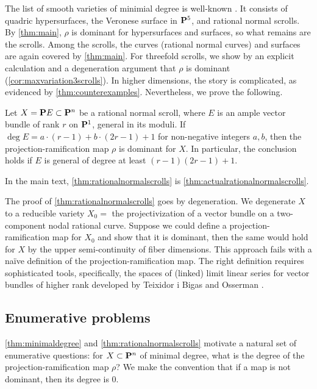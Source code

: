 \documentclass[11pt,reqno]{amsart}
\theoremstyle{plain}
\theoremstyle{definition}
\theoremstyle{remark}
\numberwithin{equation}{section}
\numberwithin{equation}{section}
\begin{document}
The list of smooth varieties of minimial degree is well-known \cite[Theorem~19.9]{har:95}.
It consists of quadric hypersurfaces, the Veronese surface in $\P^5$, and rational normal scrolls.
By \autoref{thm:main}, $\rho$ is dominant for hypersurfaces and surfaces, so what remains are the scrolls.
Among the scrolls, the curves (rational normal curves) and surfaces are again covered by \autoref{thm:main}.
For threefold scrolls, we show by an explicit calculation and a degeneration argument that $\rho$ is dominant (\autoref{cor:maxvariation3scrolls}).
In higher dimensions, the story is complicated, as evidenced by \autoref{thm:counterexamples}.
Nevertheless, we prove the following.
\begin{maintheorem}
  \label{thm:rationalnormalscrolls}
  Let $X = \P E \subset \P^n$ be a rational normal scroll, where $E$ is an ample vector bundle of rank $r$ on $\P^1$, general in its moduli.
  If $\deg E = a \cdot (r-1) + b \cdot (2r-1) + 1$ for non-negative integers $a, b$, then the projection-ramification map $\rho$ is dominant for $X$.
  In particular, the conclusion holds if $E$ is general of degree at least $(r-1)(2r-1) + 1$.
\end{maintheorem}
In the main text, \autoref{thm:rationalnormalscrolls} is \autoref{thm:actualrationalnormalscrolls}.

The proof of \autoref{thm:rationalnormalscrolls} goes by degeneration.
We degenerate $X$ to a reducible variety $X_0 = $ the projectivization of a vector bundle on a two-component nodal rational curve.
Suppose we could define a projection-ramification map for $X_0$ and show that it is dominant, then the same would hold for $X$ by the upper semi-continuity of fiber dimensions.
This approach fails with a na\"ive definition of the projection-ramification map.
The right definition requires sophisticated tools, specifically, the spaces of (linked) limit linear series for vector bundles of higher rank developed by Teixidor i Bigas \cite{tei-i-big:91} and Osserman \cite{oss:14}.

\subsection{Enumerative problems}
\autoref{thm:minimaldegree} and \autoref{thm:rationalnormalscrolls} motivate a natural set of enumerative questions: for $X \subset \P^n$ of minimal degree, what is the degree of the projection-ramification map $\rho$?
We make the convention that if a map is not dominant, then its degree is $0$.
\end{document}
